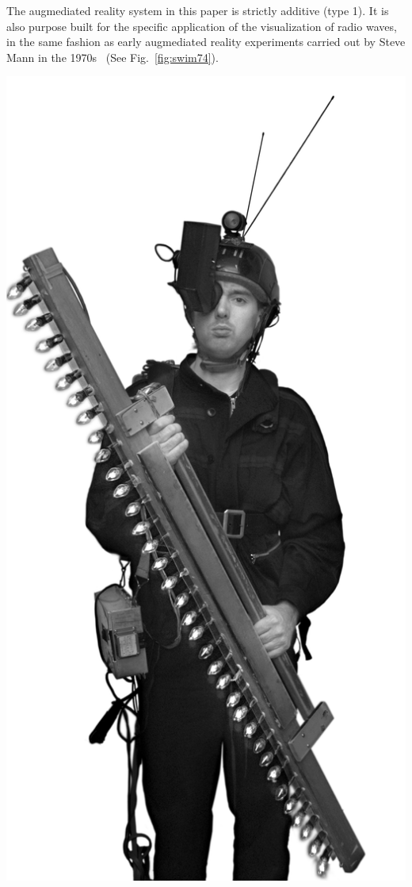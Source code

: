 \documentclass{sigchi-ext}
\begin{document}
The augmediated reality system in this paper is strictly additive (type 1). It
is also purpose built for the specific application of the visualization of
radio waves, in the same fashion as early augmediated reality experiments
carried out by Steve Mann in the 1970s~\cite{mann2015phenomenal}
(See Fig.~\ref{fig:swim74}).
\begin{marginfigure}[-39pc]
  \begin{minipage}{\marginparwidth}
 \includegraphics[width=\textwidth]{SteveMann_SequentialWaveImprintingMachine_AR_wand_6502-44_nan_crop.png}

\end{minipage}
\end{marginfigure}
\end{document}

